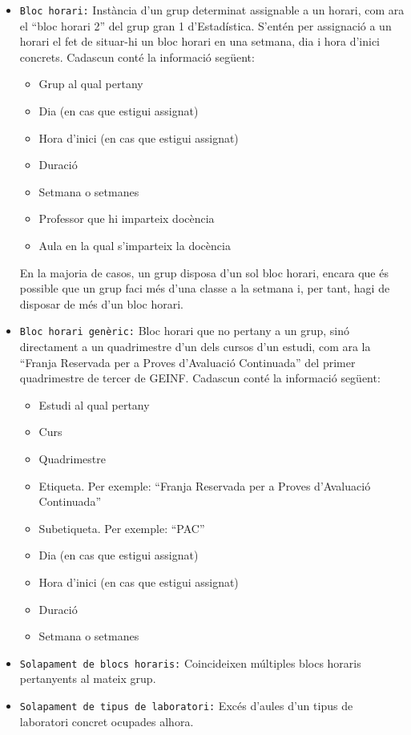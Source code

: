 \documentclass[a4paper,12pt]{ThesisStyle}
\begin{document}
\begin{itemize}
  \item \texttt{Bloc horari:} Instància d'un grup determinat assignable a un horari, com ara el ``bloc horari 2'' del grup gran 1 d'Estadística. S'entén per assignació a un horari el fet de situar-hi un bloc horari en una setmana, dia i hora d'inici concrets. Cadascun conté la informació següent:
  \begin{itemize}
    \item Grup al qual pertany
    \item Dia (en cas que estigui assignat)
    \item Hora d'inici (en cas que estigui assignat)
    \item Duració
    \item Setmana o setmanes
    \item Professor que hi imparteix docència
    \item Aula en la qual s'imparteix la docència
  \end{itemize}
  En la majoria de casos, un grup disposa d'un sol bloc horari, encara que és possible que un grup faci més d'una classe a la setmana i, per tant, hagi de disposar de més d'un bloc horari. 
  \item \texttt{Bloc horari genèric:} Bloc horari que no pertany a un grup, sinó directament a un quadrimestre d'un dels cursos d'un estudi, com ara la ``Franja Reservada per a Proves d'Avaluació Continuada'' del primer quadrimestre de tercer de GEINF. Cadascun conté la informació següent:
  \begin{itemize}
    \item Estudi al qual pertany
    \item Curs
    \item Quadrimestre
    \item Etiqueta. Per exemple: ``Franja Reservada per a Proves d'Avaluació Continuada''
    \item Subetiqueta. Per exemple: ``PAC''
    \item Dia (en cas que estigui assignat)
    \item Hora d'inici (en cas que estigui assignat)
    \item Duració
    \item Setmana o setmanes
  \end{itemize}
  \item \texttt{Solapament de blocs horaris:} Coincideixen múltiples blocs horaris pertanyents al mateix grup.
  \item \texttt{Solapament de tipus de laboratori:} Excés d'aules d'un tipus de laboratori concret ocupades alhora.

\end{itemize}
\end{document}
